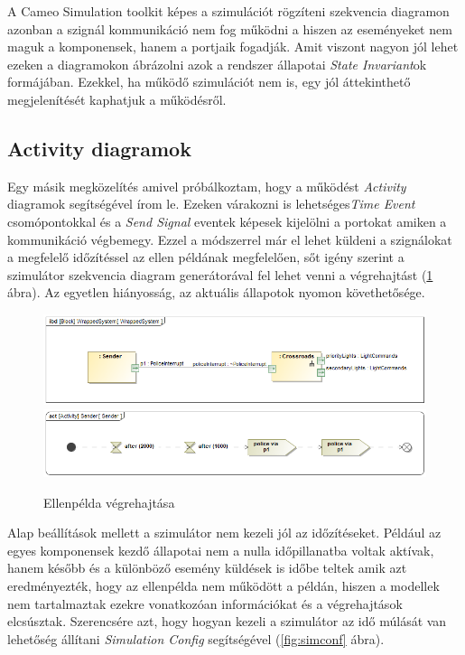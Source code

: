 A Cameo Simulation toolkit képes a szimulációt rögzíteni szekvencia diagramon azonban a szignál kommunikáció nem fog működni a hiszen az eseményeket nem maguk a komponensek, hanem a portjaik fogadják. Amit viszont nagyon jól lehet ezeken a diagramokon ábrázolni azok a rendszer állapotai \emph{State Invariant}ok formájában. Ezekkel, ha működő szimulációt nem is, egy jól áttekinthető megjelenítését kaphatjuk a működésről.

\subsection{Activity diagramok}
Egy másik megközelítés amivel próbálkoztam, hogy a működést \emph{Activity} diagramok segítségével írom le. Ezeken várakozni is lehetséges\emph{Time Event} csomópontokkal és a \emph{Send Signal} eventek képesek kijelölni a portokat amiken a kommunikáció végbemegy. Ezzel a módszerrel már el lehet küldeni a szignálokat a megfelelő időzítéssel az ellen példának megfelelően, sőt igény szerint a szimulátor szekvencia diagram generátorával fel lehet venni a végrehajtást (\ref{fig:activity-counter-example} ábra). Az egyetlen hiányosság, az aktuális állapotok nyomon követhetősége.
\begin{figure}[!ht]
	\centering
	\includegraphics[width=140mm, keepaspectratio]{figures/contribution/WrappedSystem1.png}
	\includegraphics[width=140mm, keepaspectratio]{figures/contribution/Sender.png}
	\caption{Ellenpélda végrehajtása}
	\label{fig:activity-counter-example}
\end{figure}
Alap beállítások mellett a szimulátor nem kezeli jól az időzítéseket. Például az egyes komponensek kezdő állapotai nem a nulla időpillanatba voltak aktívak, hanem később és a különböző esemény küldések is időbe teltek amik azt eredményezték, hogy az ellenpélda nem működött a példán, hiszen a modellek nem tartalmaztak ezekre vonatkozóan információkat és a végrehajtások elcsúsztak. Szerencsére azt, hogy hogyan kezeli a szimulátor az idő múlását van lehetőség állítani \emph{Simulation Config} segítségével (\ref{fig:simconf} ábra).

